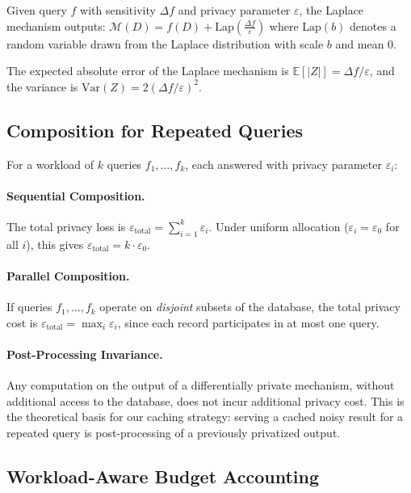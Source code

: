 \documentclass[sigconf,nonacm]{acmart}
\begin{document}
\begin{definition}
Given query $f$ with sensitivity $\Delta f$ and privacy parameter $\varepsilon$, the Laplace mechanism outputs:
$\mathcal{M}(D) = f(D) + \text{Lap}\left(\frac{\Delta f}{\varepsilon}\right)$
where $\text{Lap}(b)$ denotes a random variable drawn from the Laplace distribution with scale $b$ and mean 0.
\end{definition}

The expected absolute error of the Laplace mechanism is $\mathbb{E}[|Z|] = \Delta f / \varepsilon$, and the variance is $\text{Var}(Z) = 2(\Delta f / \varepsilon)^2$.

\subsection{Composition for Repeated Queries}

For a workload of $k$ queries $f_1, \ldots, f_k$, each answered with privacy parameter $\varepsilon_i$:

\paragraph{Sequential Composition.} The total privacy loss is $\varepsilon_{\text{total}} = \sum_{i=1}^{k} \varepsilon_i$. Under uniform allocation ($\varepsilon_i = \varepsilon_0$ for all $i$), this gives $\varepsilon_{\text{total}} = k \cdot \varepsilon_0$.

\paragraph{Parallel Composition.} If queries $f_1, \ldots, f_k$ operate on \emph{disjoint} subsets of the database, the total privacy cost is $\varepsilon_{\text{total}} = \max_i \varepsilon_i$, since each record participates in at most one query.

\paragraph{Post-Processing Invariance.} Any computation on the output of a differentially private mechanism, without additional access to the database, does not incur additional privacy cost. This is the theoretical basis for our caching strategy: serving a cached noisy result for a repeated query is post-processing of a previously privatized output.

\subsection{Workload-Aware Budget Accounting}
\end{document}
